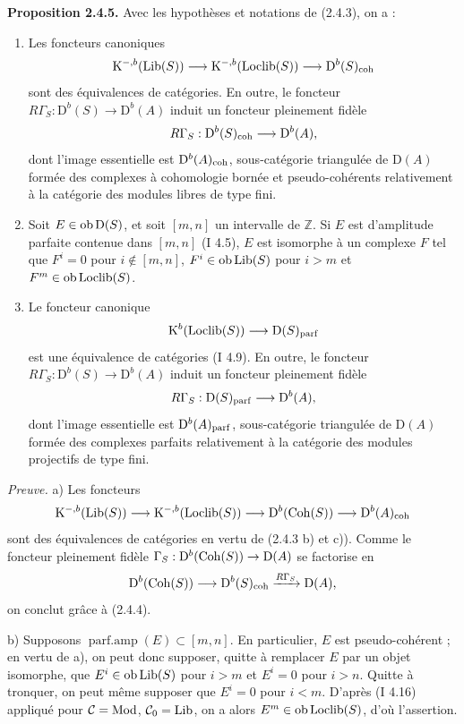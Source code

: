 \documentclass[11pt]{article}
\begin{document}
\textbf{Proposition 2.4.5.} Avec les hypothèses et notations de (2.4.3), on a :
\begin{enumerate}[label=\alph*)]
\item Les foncteurs canoniques
\[
\mathrm K^{-,b}(\operatorname{Lib}(S))\longrightarrow\mathrm K^{-,b}(\operatorname{Loclib}(S))\longrightarrow\mathrm D^b(S)_{\operatorname{coh}}
\]
sont des équivalences de catégories. En outre, le foncteur $R\Gamma_S:\mathrm D^b(S)\to\mathrm D^b(A)$ induit un foncteur pleinement fidèle
\[
R\Gamma_S:\mathrm D^b(S)_{\operatorname{coh}}\longrightarrow\mathrm D^b(A),
\]
dont l'image essentielle est $\mathrm D^b(A)_{\operatorname{coh}}$, sous-catégorie triangulée de $\mathrm D(A)$ formée des complexes à cohomologie bornée et pseudo-cohérents relativement à la catégorie des modules libres de type fini.
\item Soit $E\in\operatorname{ob}\mathrm D(S)$, et soit $[m,n]$ un intervalle de $\mathbb Z$. Si $E$ est d'amplitude parfaite contenue dans $[m,n]$ (I 4.5), $E$ est isomorphe à un complexe $F$ tel que $F^i=0$ pour $i\notin[m,n]$, $F^i\in\operatorname{ob}\operatorname{Lib}(S)$ pour $i>m$ et $F^m\in\operatorname{ob}\operatorname{Loclib}(S)$.
\item Le foncteur canonique
\[
\mathrm K^b(\operatorname{Loclib}(S))\longrightarrow\mathrm D(S)_{\operatorname{parf}}
\]
est une équivalence de catégories (I 4.9). En outre, le foncteur $R\Gamma_S:\mathrm D^b(S)\to\mathrm D^b(A)$ induit un foncteur pleinement fidèle
\[
R\Gamma_S:\mathrm D(S)_{\operatorname{parf}}\longrightarrow\mathrm D^b(A),
\]
dont l'image essentielle est $\mathrm D^b(A)_{\operatorname{parf}}$, sous-catégorie triangulée de $\mathrm D(A)$ formée des complexes parfaits relativement à la catégorie des modules projectifs de type fini.
\end{enumerate}

\emph{Preuve.} a) Les foncteurs
\[
\mathrm K^{-,b}(\operatorname{Lib}(S))\longrightarrow\mathrm K^{-,b}(\operatorname{Loclib}(S))\longrightarrow\mathrm D^b(\operatorname{Coh}(S))\longrightarrow\mathrm D^b(A)_{\operatorname{coh}}
\]
sont des équivalences de catégories en vertu de (2.4.3 b) et c)). Comme le foncteur pleinement fidèle $\Gamma_S:\mathrm D^b(\operatorname{Coh}(S))\to\mathrm D(A)$ se factorise en
\[
\mathrm D^b(\operatorname{Coh}(S))\longrightarrow\mathrm D^b(S)_{\operatorname{coh}}\xrightarrow{R\Gamma_S}\mathrm D(A),
\]
on conclut grâce à (2.4.4).

b) Supposons $\operatorname{parf.amp}(E)\subset[m,n]$. En particulier, $E$ est pseudo-cohérent ; en vertu de a), on peut donc supposer, quitte à remplacer $E$ par un objet isomorphe, que $E^i\in\operatorname{ob}\operatorname{Lib}(S)$ pour $i>m$ et $E^i=0$ pour $i>n$. Quitte à tronquer, on peut même supposer que $E^i=0$ pour $i<m$. D'après (I 4.16) appliqué pour $\mathcal C=\operatorname{Mod}$, $\mathcal C_0=\operatorname{Lib}$, on a alors $E^m\in\operatorname{ob}\operatorname{Loclib}(S)$, d'où l'assertion.
\end{document}
